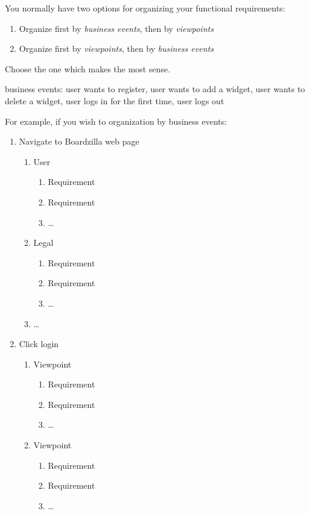 \documentclass[]{article}
\begin{document}
You normally have two options for organizing your functional requirements:
\begin{enumerate}
  \item Organize first by \emph{business events}, then by \emph{viewpoints}
  \item Organize first by \emph{viewpoints}, then by \emph{business events}
\end{enumerate}
Choose the one which makes the most sense.

business events: user wants to register, user wants to add a widget, user wants to delete a widget, user logs in for the first time, user logs out

For example, if you wish to organization by business events:
\begin{enumerate}[{BE}1.]
  \item Navigate to Boardzilla web page
  \begin{enumerate}[{VP1}.1]
    \item User
      \begin{enumerate}
        \item Requirement
        \item Requirement
        \item \dots
      \end{enumerate}
    \item Legal
      \begin{enumerate}
        \item Requirement
        \item Requirement
        \item \dots
      \end{enumerate}
    \item \dots
  \end{enumerate}
  \item Click login
  \begin{enumerate}[{VP2}.1]
    \item Viewpoint
      \begin{enumerate}
        \item Requirement
        \item Requirement
        \item \dots
      \end{enumerate}
    \item Viewpoint
      \begin{enumerate}
        \item Requirement
        \item Requirement
        \item \dots

\end{enumerate}
\end{enumerate}
\end{enumerate}
\end{document}
